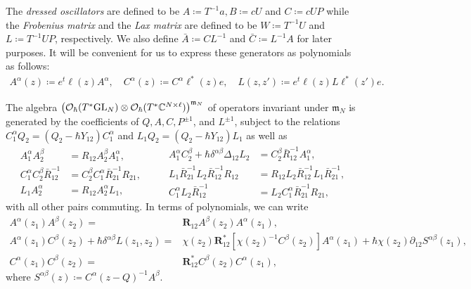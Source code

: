 \begin{definition}
The \emph{dressed oscillators} are defined to be $A \coloneq T^{-1} a, B \coloneq cU$ and $C \coloneq cUP$ while the \emph{Frobenius matrix} and the \emph{Lax matrix} are defined to be $W \coloneq T^{-1} U$ and $L \coloneq T^{-1} UP$, respectively. We also define $\bar A \coloneq C L^{-1}$ and $\bar C \coloneq L^{-1} A$ for later purposes. It will be convenient for us to express these generators as polynomials as follows:
\begin{align}
A^\alpha(z) \coloneq e^t \ell(z) A^\alpha, \quad C^\alpha(z) \coloneq C^\alpha \ell^*(z) e, \quad L(z,z') \coloneq e^t \ell(z) L \ell^*(z') e.
\end{align}
\end{definition}

\begin{prop}
The algebra $\left( \mathcal{O}_\hbar(T^* \mathrm{GL}_N) \otimes \mathcal{O}_\hbar(T^* \mathbb{C}^{N \times \ell}) \right)^{\mathfrak{m}_N}$ of operators invariant under $\mathfrak{m}_N$ is generated by the coefficients of $Q,A,C,P^{\pm 1}$, and $L^{\pm 1}$, subject to the relations $C_1^\alpha Q_2 = (Q_2-\hbar Y_{12}) C_1^\alpha$ and $L_1 Q_2 = (Q_2-\hbar Y_{12}) L_1$ as well as
\begin{equation}
\begin{aligned}
A_1^\alpha A_2^\beta &= R_{12} A_2^\beta A_1^\alpha, \\
C_1^\alpha C_2^\beta \bar R_{12}^{-1} &= C_2^\beta C_1^\alpha \bar R_{21}^{-1} R_{21}, \\
L_1 A_2^\alpha &= R_{12} A_2^\alpha L_1,
\end{aligned}
\qquad
\begin{aligned}
A_1^\alpha C_2^\beta + \hbar\delta^{\alpha\beta} \Delta_{12} L_2 &= C_2^\beta \bar R_{12}^{-1} A_1^\alpha, \\
L_1 \bar R_{21}^{-1} L_2 \bar R_{12}^{-1} R_{12} &= R_{12} L_2 \bar R_{12}^{-1} L_1 \bar R_{21}^{-1}, \\
C_1^\alpha L_2 \bar R_{12}^{-1} &= L_2 C_1^\alpha \bar R_{21}^{-1} R_{21},
\end{aligned}
\end{equation}
with all other pairs commuting. In terms of polynomials, we can write
\begin{align}
A^\alpha(z_1) A^\beta(z_2) ={}& \mathbf{R}_{12} A^\beta(z_2) A^\alpha(z_1), \\
A^\alpha(z_1) C^\beta(z_2) + \hbar\delta^{\alpha\beta} L(z_1,z_2) ={}& \chi(z_2) \mathbf{R}_{12}^*[\chi(z_2)^{-1} C^\beta(z_2)] A^\alpha(z_1) + \hbar \chi(z_2) \partial_{12} S^{\alpha\beta}(z_1), \\
C^\alpha(z_1) C^\beta(z_2) ={}& \mathbf{R}_{12}^* C^\beta(z_2) C^\alpha(z_1),
\end{align}
where $S^{\alpha\beta}(z) \coloneq C^\alpha (z-Q)^{-1} A^\beta$.
\end{prop}

